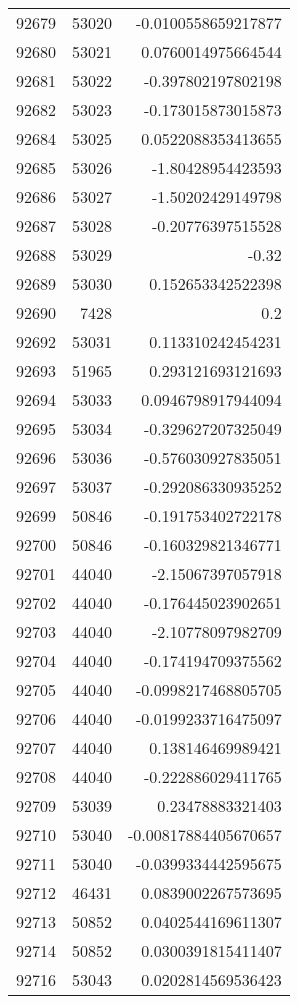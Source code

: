 \begin{tabular}{r | r | r}
92679 & 53020 & -0.0100558659217877 \\
92680 & 53021 & 0.0760014975664544 \\
92681 & 53022 & -0.397802197802198 \\
92682 & 53023 & -0.173015873015873 \\
92684 & 53025 & 0.0522088353413655 \\
92685 & 53026 & -1.80428954423593 \\
92686 & 53027 & -1.50202429149798 \\
92687 & 53028 & -0.20776397515528 \\
92688 & 53029 & -0.32 \\
92689 & 53030 & 0.152653342522398 \\
92690 & 7428 & 0.2 \\
92692 & 53031 & 0.113310242454231 \\
92693 & 51965 & 0.293121693121693 \\
92694 & 53033 & 0.0946798917944094 \\
92695 & 53034 & -0.329627207325049 \\
92696 & 53036 & -0.576030927835051 \\
92697 & 53037 & -0.292086330935252 \\
92699 & 50846 & -0.191753402722178 \\
92700 & 50846 & -0.160329821346771 \\
92701 & 44040 & -2.15067397057918 \\
92702 & 44040 & -0.176445023902651 \\
92703 & 44040 & -2.10778097982709 \\
92704 & 44040 & -0.174194709375562 \\
92705 & 44040 & -0.0998217468805705 \\
92706 & 44040 & -0.0199233716475097 \\
92707 & 44040 & 0.138146469989421 \\
92708 & 44040 & -0.222886029411765 \\
92709 & 53039 & 0.23478883321403 \\
92710 & 53040 & -0.00817884405670657 \\
92711 & 53040 & -0.0399334442595675 \\
92712 & 46431 & 0.0839002267573695 \\
92713 & 50852 & 0.0402544169611307 \\
92714 & 50852 & 0.0300391815411407 \\
92716 & 53043 & 0.0202814569536423 \\

\end{tabular}
